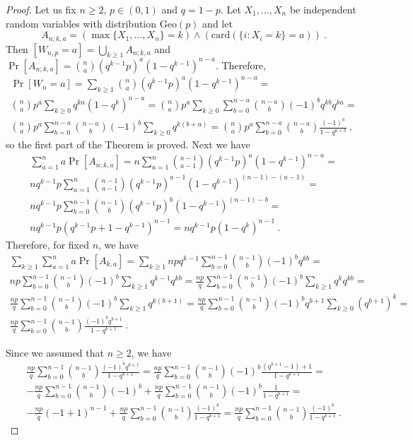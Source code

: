 \documentclass[proceedings]{dmtcs}
\newcommand{\Geo}[1]{\mathrm{Geo}(#1)}
\newcommand{\card}[1]{\mathrm{card}\left(#1\right)}
\begin{document}
\begin{proof} 
Let us fix $n\geq 2$, $p \in (0,1)$ and $q=1-p$.
Let $X_1,\ldots,X_n$ be independent random variables with distribution $\Geo{p}$ and
let
$$
  A_{n;k,a} =(\max\{X_1,\ldots,X_n\}=k) \land (\card{\{ i : X_i = k\} = a})~.
$$
Then
$[W_{n,p}=a] =  \bigcup_{k\geq 1} A_{n;k,a}$
and 
$\Pr[A_{n;k,a}] = \binom{n}{a} (q^{k-1}p)^a (1-q^{k-1})^{n-a}$.
Therefore,
\begin{gather*}
  \Pr[W_n=a] = \sum_{k\geq 1} \binom{n}{a} (q^{k-1}p)^a(1-q^{k-1})^{n-a} = \\
	\binom{n}{a} p^a  \sum_{k\geq 0} q^{ka}(1-q^k)^{n-a} = 
	\binom{n}{a} p^a  \sum_{k\geq 0}\sum_{b=0}^{n-a} \binom{n-a}{b}(-1)^b q^{kb}q^{ka} = \\ 
	\binom{n}{a} p^a  \sum_{b=0}^{n-a} \binom{n-a}{b}(-1)^b \sum_{k\geq 0}q^{k(b+a)} = 
	\binom{n}{a} p^a  \sum_{b=0}^{n-a} \binom{n-a}{b} \frac{(-1)^b}{1-q^{a+b}} ~,
\end{gather*}
so the first part of the Theorem is proved.
Next we have
\begin{gather*}
\sum_{a=1}^{n} a \Pr[A_{n;k,a}] = 
n \sum_{a=1}^{n} \binom{n-1}{a-1} (q^{k-1}p)^a (1-q^{k-1})^{n-a} = \\
n q^{k-1}p \sum_{a=1}^{n} \binom{n-1}{a-1} (q^{k-1}p)^{a-1} (1-q^{k-1})^{(n-1)-(a-1)} = \\
n q^{k-1}p \sum_{b=0}^{n-1} \binom{n-1}{b} (q^{k-1}p)^{b} (1-q^{k-1})^{(n-1)-b} = \\
n q^{k-1}p (q^{k-1}p + 1- q^{k-1})^{n-1} =
n q^{k-1}p (1-q^k)^{n-1}~.
\end{gather*}
Therefore, for fixed $n$, we have
\begin{gather*}
\sum_{k\geq 1}\sum_{a=1}^{n} a \Pr[A_{k,a}] = 
\sum_{k\geq 1} n p q^{k-1} \sum_{b=0}^{n-1} \binom{n-1}{b}(-1)^b q^{k b} = \\
n p \sum_{b=0}^{n-1} \binom{n-1}{b}(-1)^b \sum_{k\geq 1}  q^{k-1} q^{k b} = 
\frac{n p}{q} \sum_{b=0}^{n-1} \binom{n-1}{b}(-1)^b \sum_{k\geq 1}  q^k q^{k b} = \\
\frac{n p}{q} \sum_{b=0}^{n-1} \binom{n-1}{b}(-1)^b \sum_{k\geq 1}  q^{k (b+1)} = 
\frac{n p}{q} \sum_{b=0}^{n-1} \binom{n-1}{b}(-1)^b q^{b+1}\sum_{k\geq 0}  (q^{b+1})^k = \\
\frac{n p}{q} \sum_{b=0}^{n-1} \binom{n-1}{b} \frac{(-1)^b q^{b+1}}{1- q^{b+1}}~.
\end{gather*}

Since we assumed that $n\geq 2$, we have
\begin{gather*}
\frac{n p}{q} \sum_{b=0}^{n-1} \binom{n-1}{b} \frac{(-1)^b q^{b+1}}{1- q^{b+1}} = 
\frac{n p}{q} \sum_{b=0}^{n-1} \binom{n-1}{b} (-1)^b \frac{ (q^{b+1}-1) +1}{1- q^{b+1}} = \\ 
-\frac{n p}{q} \sum_{b=0}^{n-1} \binom{n-1}{b} (-1)^b + 
\frac{n p}{q} \sum_{b=0}^{n-1} \binom{n-1}{b} (-1)^b \frac{1}{1- q^{b+1}} = \\
-\frac{n p}{q} (-1+1)^{n-1} + 
\frac{n p}{q} \sum_{b=0}^{n-1} \binom{n-1}{b}  \frac{(-1)^b}{1- q^{b+1}} =
\frac{n p}{q} \sum_{b=0}^{n-1} \binom{n-1}{b}  \frac{(-1)^b}{1- q^{b+1}}~. 
\end{gather*}

\end{proof}
\end{document}
